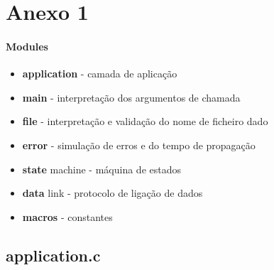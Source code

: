 \section{Anexo 1}

\paragraph{Modules}

\begin{itemize}
    \item \textbf{application} - camada de aplicação
    \item \textbf{main} - interpretação dos argumentos de chamada
    \item \textbf{file} - interpretação e validação do nome de ficheiro dado
    \item \textbf{error} - simulação de erros e do tempo de propagação
    \item \textbf{state} machine - máquina de estados
    \item \textbf{data} link - protocolo de ligação de dados
    \item \textbf{macros} - constantes
\end{itemize}

\subsection{application.c}

